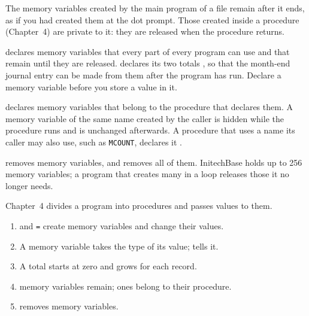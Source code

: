 The memory variables created by the main program of a file remain after it
ends, as if you had created them at the dot prompt.  Those created inside a
procedure (Chapter~4) are private to it: they are released when the procedure
returns.

 declares memory variables that every part of every program can use
and that remain until they are released.   declares its two
totals , so that the month-end journal entry can be made from them
after the program has run.  Declare a memory variable  before you
store a value in it.

 declares memory variables that belong to the procedure that
declares them.  A memory variable of the same name created by the caller is
hidden while the procedure runs and is unchanged afterwards.  A procedure that
uses a name its caller may also use, such as \texttt{MCOUNT}, declares it
.

 removes memory variables, and  removes all of them.
InitechBase holds up to 256 memory variables; a program that creates many in a
loop releases those it no longer needs.

Chapter~4 divides a program into procedures and passes values to them.

\begin{enumerate}
\item {} and \texttt{=} create memory variables and change their values.
\item A memory variable takes the type of its value;  tells it.
\item A total starts at zero and grows for each record.
\item {} memory variables remain;  ones belong to their
  procedure.
\item {} removes memory variables.
\end{enumerate}

